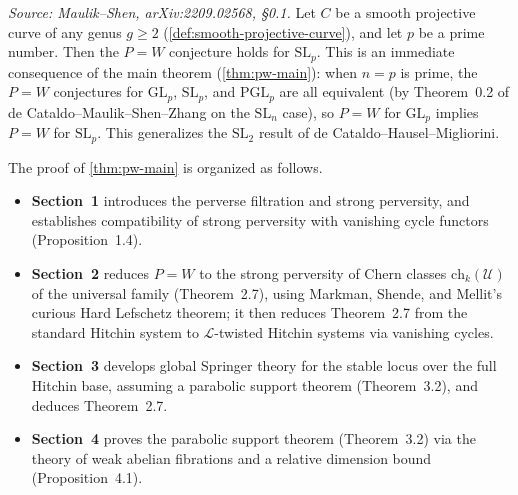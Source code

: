 \begin{corollary}[$P=W$ for $\mathrm{SL}_p$, $p$ prime]
  \label{cor:pw-slp}
  \textit{Source: Maulik--Shen, arXiv:2209.02568, §0.1.}
  Let $C$ be a smooth projective curve of any genus $g \geq 2$
  (\cref{def:smooth-projective-curve}), and let $p$ be a prime number.  Then the $P=W$
  conjecture holds for $\mathrm{SL}_p$.  This is an immediate consequence of the main theorem
  (\cref{thm:pw-main}): when $n = p$ is prime, the $P=W$ conjectures for $\mathrm{GL}_p$,
  $\mathrm{SL}_p$, and $\mathrm{PGL}_p$ are all equivalent (by Theorem~0.2 of de Cataldo--Maulik--Shen--Zhang
  on the $\mathrm{SL}_n$ case), so $P=W$ for $\mathrm{GL}_p$ implies $P=W$ for $\mathrm{SL}_p$.
  This generalizes the $\mathrm{SL}_2$ result of de Cataldo--Hausel--Migliorini.
\end{corollary}

\begin{remark}
  \label{rem:proof-structure}
  The proof of \cref{thm:pw-main} is organized as follows.
  \begin{itemize}
    \item \textbf{Section~1} introduces the perverse filtration and strong perversity, and
      establishes compatibility of strong perversity with vanishing cycle functors
      (Proposition~1.4).
    \item \textbf{Section~2} reduces $P=W$ to the strong perversity of Chern classes
      $\mathrm{ch}_k(\mathcal{U})$ of the universal family (Theorem~2.7), using Markman,
      Shende, and Mellit's curious Hard Lefschetz theorem; it then reduces Theorem~2.7 from
      the standard Hitchin system to $\mathcal{L}$-twisted Hitchin systems via vanishing
      cycles.
    \item \textbf{Section~3} develops global Springer theory for the stable locus over the
      full Hitchin base, assuming a parabolic support theorem (Theorem~3.2), and deduces
      Theorem~2.7.
    \item \textbf{Section~4} proves the parabolic support theorem (Theorem~3.2) via the
      theory of weak abelian fibrations and a relative dimension bound (Proposition~4.1).
  \end{itemize}
\end{remark}

